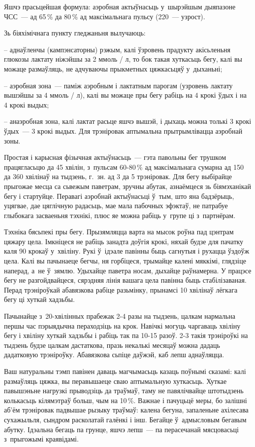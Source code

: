 Яшчэ прасьцейшая формула: аэробная актыўнасьць у~шырэйшым дыяпазоне ЧСС~--- ад 65\,\% да 80\,\% ад максімальнага пульсу (220~--- узрост).

Зь біяхімічнага пункту гледжаньня вылучаюць: 

– аднаўленчы (кампэнсаторны) рэжым, калі ўзровень прадукту акісьленьня глюкозы лактату ніжэйшы за 2 ммоль / л, то бок такая хуткасьць бегу, калі вы можаце размаўляць, не адчуваючы прыкметных цяжкасьцяў у~дыханьні;

– аэробная зона~--- паміж аэробным і лактатным парогам (узровень лактату вышэйшы за 4 ммоль / л), калі вы можаце пры бегу рабіць на 4 крокі ўдых і на 4 крокі выдых;

– анаэробная зона, калі лактат расьце яшчэ вышэй, і дыхаць можна толькі 3 крокі ўдых~--- 3 крокі выдых. Для трэніровак аптымальна прытрымлівацца аэробнай зоны.

Простая і карысная фізычная актыўнасьць~--- гэта павольны бег трушком працягласьцю да 45 хвілін, з~пульсам 60-80\,\% ад максімальнага сумарна ад 150 да 360 хвілінаў на тыдзень, г.~зн. ад 3 да 5 трэніровак. Для бегу выбірайце прыгожае месца са сьвежым паветрам, зручны абутак, азнаёмцеся зь біямэханікай бегу і стартуйце. Перавагі аэробнай актыўнасьці ў~тым, што яна бадзёрыць, уцягвае, дае цяглічную радасьць, мае мала пабочных эфэктаў, не патрабуе глыбокага засваеньня тэхнікі, плюс яе можна рабіць у~групе ці з~партнёрам.

Тэхніка бясьпекі пры бегу. Прызямляцца варта на мысок роўна пад цэнтрам цяжару цела. Імкніцеся не рабіць занадта доўгія крокі, няхай будзе для пачатку каля 90 крокаў у~хвіліну. Рукі ў~ідэале павінны быць сагнутыя і рухацца ўздоўж цела. Калі вы пачынаеце бегчы, ня горбіцеся, трымайце калені мяккімі, глядзіце наперад, а~не ў~зямлю. Удыхайце паветра носам, дыхайце раўнамерна. У працэсе бегу не разгойдвайцеся, сярэдняя лінія вашага цела павінна быць стабілізаваная. Перад трэніроўкай абавязкова рабіце разьмінку, прынамсі 10 хвілінаў лёгкага бегу ці хуткай хадзьбы.

Пачынайце з~20-хвілінных прабежак 2-4 разы на тыдзень, цалкам нармальна першы час пэрыядычна пераходзіць на крок. Навічкі могуць чаргаваць хвіліну бегу і хвіліну хуткай хадзьбы і рабіць так па 10-15 разоў. 2-3 такія трэніроўкі на тыдзень будзе цалкам дастаткова, празь некалькі месяцаў можна дадаць дадатковую трэніроўку. Абавязкова сьпіце даўжэй, каб лепш аднаўляцца.

Ваш натуральны тэмп павінен даваць магчымасьць казаць поўнымі сказамі: калі размаўляць цяжка, вы перавышаеце сваю аптымальную хуткасьць. Хуткае павышэньне нагрузкі прыводзіць да траўмаў, таму не павялічвайце штотыдзень колькасьць кілямэтраў больш, чым на 10\,\%. Важнае і пачуцьцё меры, бо залішні аб'ём трэніровак падвышае рызыку траўмаў: калена бегуна, запаленьне ахілесава сухажыльля, сындром расколатай галёнкі і інш. Бегайце ў~адмысловым бегавым абутку. Ідэальна бегаць па грунце, яшчэ лепш~--- па перасечанай мясцовасьці з~прыгожымі краявідамі.

